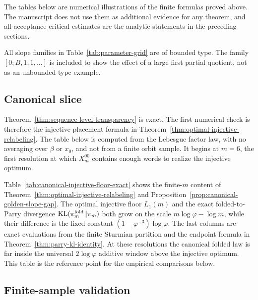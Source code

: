 The tables below are numerical illustrations of the finite formulas proved
above.  The manuscript does not use them as additional evidence for any theorem,
and all acceptance-critical estimates are the analytic statements in the
preceding sections.

All slope families in Table~\ref{tab:parameter-grid} are of bounded type.  The
family \([0;B,1,1,\dots]\) is included to show the effect of a large first
partial quotient, not as an unbounded-type example.

\subsection{Canonical slice}

Theorem~\ref{thm:sequence-level-transparency} is exact.  The first numerical
check is therefore the injective placement formula in
Theorem~\ref{thm:optimal-injective-relabeling}.  The table below is computed
from the Lebesgue factor law, with no averaging over \(\beta\) or \(x_0\), and
not from a finite orbit sample.  It begins at \(m=6\), the first resolution at
which \(X_m^{00}\) contains enough words to realize the injective optimum.



Table~\ref{tab:canonical-injective-floor-exact} shows the finite-\(m\)
content of Theorem~\ref{thm:optimal-injective-relabeling} and
Proposition~\ref{prop:canonical-golden-slope-gap}. The optimal injective
floor \(L_1(m)\) and the exact folded-to-Parry divergence
\(\operatorname{KL}(\pi_m^{\mathrm{fold}}\|\pi_m)\) both grow on the scale
\(m\log\varphi-\log m\), while their difference is the fixed constant
\((1-\varphi^{-3})\log\varphi\).  The last columns are exact evaluations from
the finite Sturmian partition and the endpoint formula in
Theorem~\ref{thm:parry-kl-identity}.  At these resolutions the canonical
folded law is far inside the universal \(2\log\varphi\) additive window above
the injective optimum.  This table is the reference point for the empirical
comparisons below.

\subsection{Finite-sample validation}

